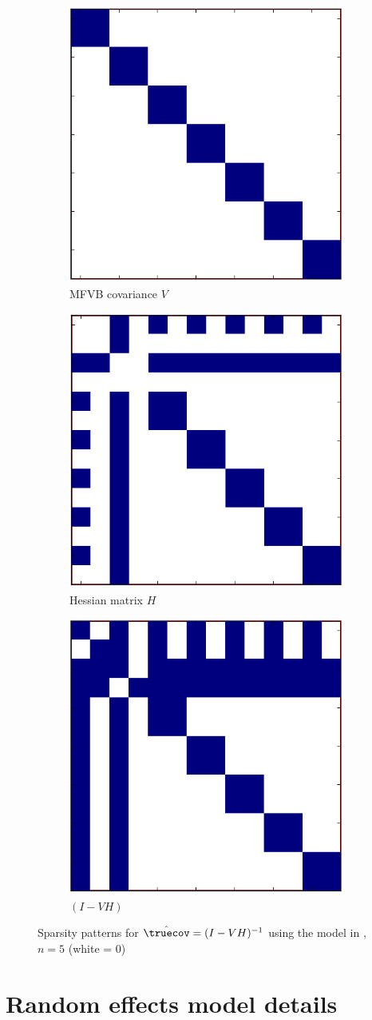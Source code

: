 \begin{figure}[ht!]
  \centering
  \begin{subfigure}{0.3\linewidth}
    \centering
    \includegraphics[height=0.3 \linewidth]{./static_images/cov_modified.png}
    \caption{\label{fig:V_sparse} MFVB covariance $V$}
  \end{subfigure}
  \begin{subfigure}{0.3\linewidth}
    \centering
    \includegraphics[height=0.3 \linewidth]{./static_images/hessian_modified.png}
    \caption{\label{fig:H_sparse} Hessian matrix $H$}
  \end{subfigure}
  \begin{subfigure}{0.3\linewidth}
    \centering
    \includegraphics[height=0.3 \linewidth]{./static_images/lrvb_modified.png}
    \caption{\label{fig:IVH_sparse} \mbox{$(I - VH)$}}
  \end{subfigure}
  \caption{Sparsity patterns for $\hat\truecov = (I - VH)^{-1}$ using the model in , $n = 5$ (white = 0)}
  \label{fig:sparsity_patterns}
\end{figure}



\section{Random effects model details} \label{app:re_details}

